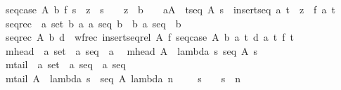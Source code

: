 \begin{isabellebody}
\ \ {\isachardoublequoteopen}seq{\isacharunderscore}case\ A\ b\ f\ s\ {\isacharequal}{\isacharequal}\ {\isacharat}z{\isachardot}\ \ {\isacharparenleft}s\ {\isacharequal}\ {\isacharpercent}{\isacharless}{\isacharpercent}{\isachargreater}\ {\isacharminus}{\isacharminus}{\isachargreater}\ z\ {\isacharequal}\ b{\isacharparenright}\ \ {\isacharampersand}\ {\isacharparenleft}{\isacharbang}\ a{\isacharcolon}A{\isachardot}\ {\isacharbang}\ t{\isacharcolon}seq\ A{\isachardot}\ s\ {\isacharequal}\ insertseq\ a\ t\ {\isacharminus}{\isacharminus}{\isachargreater}\ z\ {\isacharequal}\ f\ a\ t{\isacharparenright}{\isachardoublequoteclose}\isanewline
\isanewline
\ \ seq{\isacharunderscore}rec\ {\isacharcolon}{\isacharcolon}\ {\isachardoublequoteopen}{\isacharbrackleft}{\isacharprime}a\ set{\isacharcomma}\ {\isacharprime}b{\isacharcomma}\ {\isacharbrackleft}{\isacharprime}a{\isacharcomma}\ {\isacharprime}a\ seq{\isacharcomma}\ {\isacharprime}b{\isacharbrackright}\ {\isacharequal}{\isachargreater}\ {\isacharprime}b{\isacharcomma}\ {\isacharprime}a\ seq{\isacharbrackright}\ {\isacharequal}{\isachargreater}\ {\isacharprime}b{\isachardoublequoteclose}\isanewline
\ \ {\isachardoublequoteopen}seq{\isacharunderscore}rec\ A\ b\ d\ {\isacharequal}{\isacharequal}\ wfrec\ {\isacharparenleft}insertseq{\isacharunderscore}rel\ A{\isacharparenright}\ {\isacharparenleft}{\isacharpercent}f{\isachardot}\ seq{\isacharunderscore}case\ A\ b\ {\isacharparenleft}{\isacharpercent}a\ t{\isachardot}\ d\ a\ t\ {\isacharparenleft}f\ t{\isacharparenright}{\isacharparenright}{\isacharparenright}{\isachardoublequoteclose}\isanewline
\isanewline
\ \ mhead\ {\isacharcolon}{\isacharcolon}\ {\isachardoublequoteopen}{\isacharprime}a\ set\ {\isacharequal}{\isachargreater}\ {\isacharprime}a\ seq\ {\isacharless}{\isacharequal}{\isachargreater}\ {\isacharprime}a{\isachardoublequoteclose}\isanewline
\ \ {\isachardoublequoteopen}mhead\ A\ {\isacharequal}{\isacharequal}\ lambda\ s{\isacharcolon}\ seq\ A{\isachardot}\ s\ {\isacharpercent}{\isacharcircum}\ {}{\isachardoublequoteclose}\isanewline
\isanewline
\ \ mtail\ {\isacharcolon}{\isacharcolon}\ {\isachardoublequoteopen}{\isacharprime}a\ set\ {\isacharequal}{\isachargreater}\ {\isacharprime}a\ seq\ {\isacharless}{\isacharequal}{\isachargreater}\ {\isacharprime}a\ seq{\isachardoublequoteclose}\isanewline
\ \ {\isachardoublequoteopen}mtail\ A\ {\isacharequal}{\isacharequal}\ lambda\ s\ {\isacharcolon}\ seq\ A{\isachardot}\ lambda\ n\ {\isacharcolon}\ {\isacharparenleft}{}\ {\isachardot}{\isachardot}\ {\isacharparenleft}{\isacharparenleft}{\isacharhash}\ s{\isacharparenright}\ {\isacharminus}\ {\isacharparenleft}{}{\isacharparenright}{\isacharparenright}{\isacharparenright}\ {\isachardot}\ s\ {\isacharpercent}{\isacharcircum}\ {\isacharparenleft}n{\isacharplus}{}{\isacharparenright}{\isachardoublequoteclose}\isanewline

\end{isabellebody}

